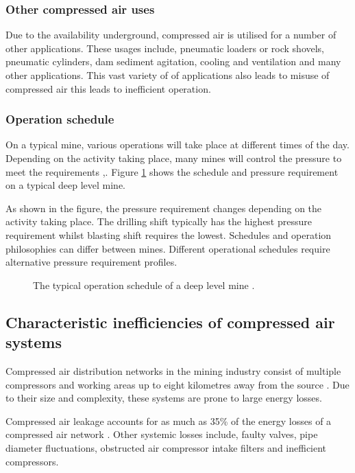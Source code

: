 			\subsubsection{Other compressed air uses}
			 	 Due to the availability underground, compressed air is utilised for a number of other applications. These usages include, pneumatic loaders or rock shovels, pneumatic cylinders, dam sediment agitation, cooling and ventilation and many other applications. This vast variety of of applications also leads to misuse of compressed air this leads to inefficient operation.
			\subsubsection{Operation schedule}
				On a typical mine, various operations will take place at different times of the day. Depending on the activity taking place, many mines will control the pressure to meet the requirements \cite{Kriel2014Masters},\cite{Marais2012PhD}. Figure \ref{fig: Mining schedule} shows the schedule and pressure requirement on a typical deep level mine.\par 
				As shown in the figure, the pressure requirement changes depending on the activity taking place. The drilling shift typically has the highest pressure requirement whilst blasting shift requires the lowest. Schedules and operation philosophies can differ between mines. Different operational schedules require alternative pressure requirement profiles.
				\begin{figure}[h]
					\centering
					\fbox{}
					\caption[A typical operation schedule of a deep level mine.]{The typical operation schedule of a deep level mine \cite{Kriel2014Masters}.}
					\label{fig: Mining schedule}
				\end{figure}
	\subsection{Characteristic inefficiencies of compressed air systems}
		Compressed air distribution networks in the mining industry consist of multiple compressors and working areas up to eight kilometres away from the source \cite{Marais2012PhD}. Due to their size and complexity, these systems are prone to large energy losses.
		\par 
		Compressed air leakage accounts for as much as 35\% of the energy losses of a compressed air network \cite{Lawrence2004Improving}. Other systemic losses include, faulty valves, pipe diameter fluctuations, obstructed air compressor intake filters and inefficient compressors. 	

